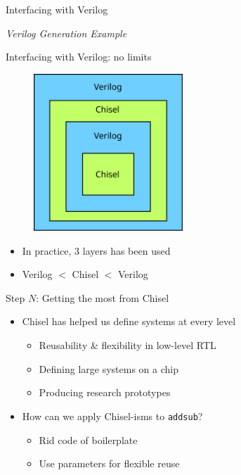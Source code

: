 \documentclass{beamer}
\begin{document}
\begin{frame}{Interfacing with Verilog}
  \begin{center}
    \textit{Verilog Generation Example}
  \end{center}
\end{frame}

\begin{frame}{Interfacing with Verilog: no limits}
  \begin{figure}
    \centering
    \includegraphics[width=0.5\textwidth]{figs/layers.svg}
  \end{figure}
  \begin{itemize}
    \item In practice, 3 layers has been used
    \item Verilog $<$ Chisel $<$ Verilog
  \end{itemize}
\end{frame}

\begin{frame}{Step $N$: Getting the most from Chisel}
  \begin{itemize}
  \item Chisel has helped us define systems at every level
    \begin{itemize}
      \item Reusability \& flexibility in low-level RTL
      \item Defining large systems on a chip
      \item Producing research prototypes
    \end{itemize}
  \item How can we apply Chisel-isms to \texttt{addsub}?
    \begin{itemize}
      \item Rid code of boilerplate
      \item Use parameters for flexible reuse
    \end{itemize}
  \end{itemize}
\end{frame}
\end{document}
